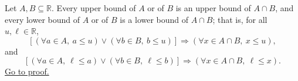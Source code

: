 \begin{corollary}
\label{cor:intersections-inherit-bounds}
Let $A,B\subseteq\mathbb{R}$. Every upper bound of $A$ or of $B$ is an
upper bound of $A\cap B$, and every lower bound of $A$ or of $B$ is a
lower bound of $A\cap B$; that is, for all $u,\ell\in\mathbb{R}$,
\[
\left[
(\forall a\in A,\ a\leq u)
\lor
(\forall b\in B,\ b\leq u)
\right]
\Longrightarrow
(\forall x\in A\cap B,\ x\leq u),
\]
and
\[
\left[
(\forall a\in A,\ \ell\leq a)
\lor
(\forall b\in B,\ \ell\leq b)
\right]
\Longrightarrow
(\forall x\in A\cap B,\ \ell\leq x).
\]
\hyperref[prf:intersections-inherit-bounds]{Go to proof.}
\end{corollary}